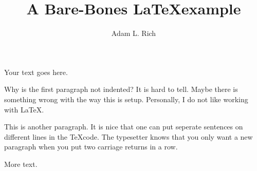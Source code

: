 \documentclass{minimal}
\title{A Bare-Bones \LaTeX example}
\author{Adam L. Rich}
\begin{document}

Your text goes here.

Why is the first paragraph not indented?  
It is hard to tell.  
Maybe there is something wrong with the way this is setup.  
Personally, I do not like working with \LaTeX.

This is another paragraph.
It is nice that one can put seperate sentences on different lines in the \TeX code.
The typesetter knows that you only want a new paragraph when you put two carriage returns in a row.

More text.
\end{document}
